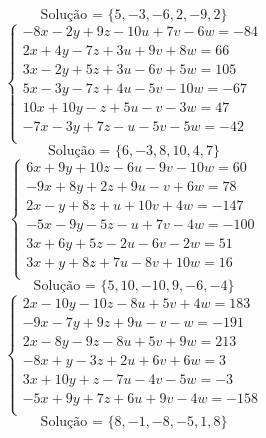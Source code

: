 \documentclass[12pt,oneside,a4paper]{article}
\begin{document}
\begin{equation*}
\text{Solução = }\{5,-3,-6,2,-9,2\}
\end{equation*}
\vspace{\baselineskip}
\begin{equation*}
\begin{cases}
-8x-2y+9z-10u+7v-6w=-84 \\
2x+4y-7z+3u+9v+8w=66 \\
3x-2y+5z+3u-6v+5w=105 \\
5x-3y-7z+4u-5v-10w=-67 \\
10x+10y-z+5u-v-3w=47 \\
-7x-3y+7z-u-5v-5w=-42 \\
\end{cases}
\end{equation*}
\begin{equation*}
\text{Solução = }\{6,-3,8,10,4,7\}
\end{equation*}
\vspace{\baselineskip}
\begin{equation*}
\begin{cases}
6x+9y+10z-6u-9v-10w=60 \\
-9x+8y+2z+9u-v+6w=78 \\
2x-y+8z+u+10v+4w=-147 \\
-5x-9y-5z-u+7v-4w=-100 \\
3x+6y+5z-2u-6v-2w=51 \\
3x+y+8z+7u-8v+10w=16 \\
\end{cases}
\end{equation*}
\begin{equation*}
\text{Solução = }\{5,10,-10,9,-6,-4\}
\end{equation*}
\vspace{\baselineskip}
\begin{equation*}
\begin{cases}
2x-10y-10z-8u+5v+4w=183 \\
-9x-7y+9z+9u-v-w=-191 \\
2x-8y-9z-8u+5v+9w=213 \\
-8x+y-3z+2u+6v+6w=3 \\
3x+10y+z-7u-4v-5w=-3 \\
-5x+9y+7z+6u+9v-4w=-158 \\
\end{cases}
\end{equation*}
\begin{equation*}
\text{Solução = }\{8,-1,-8,-5,1,8\}
\end{equation*}
\end{document}
